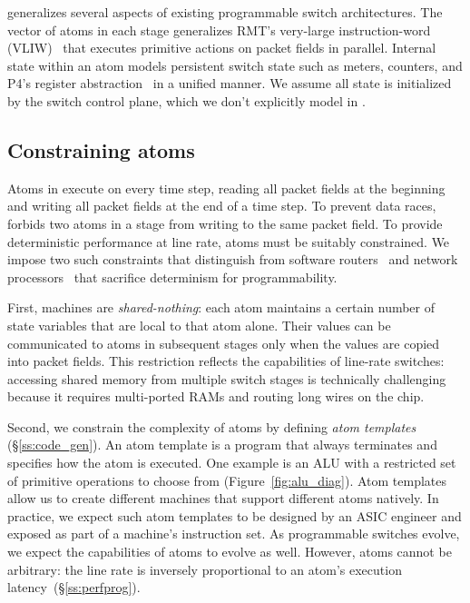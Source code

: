 \absmachine generalizes several aspects of existing programmable switch
architectures. The vector of atoms in each stage generalizes RMT's very-large
instruction-word (VLIW)~\cite{rmt} that executes primitive actions on packet
fields in parallel. Internal state within an atom models persistent switch
state such as meters, counters, and P4's register abstraction~\cite{p4spec} in
a unified manner. We assume all state is initialized by the switch control
plane, which we don't explicitly model in \absmachine.

\subsection{Constraining atoms}
\label{s:atomConstraints}

Atoms in \absmachine execute on every time step, reading all packet fields at
the beginning and writing all packet fields at the end of a time step. To
prevent data races, \absmachine forbids two atoms in a stage from writing to
the same packet field.  To provide deterministic performance at line rate,
atoms must be suitably constrained.  We impose two such constraints that
distinguish \absmachine from software routers~\cite{click} and network
processors~\cite{ixp4xx} that sacrifice determinism for programmability.

First, \absmachine machines are \textit{shared-nothing}: each atom maintains a
certain number of state variables that are local to that atom alone. Their
values can be communicated to atoms in subsequent stages only when the values
are copied into packet fields. This restriction reflects the capabilities of
line-rate switches: accessing shared memory from multiple switch stages is
technically challenging because it requires multi-ported RAMs and routing long
wires on the chip.

Second, we constrain the complexity of atoms by defining {\it atom templates}
(\S\ref{ss:code_gen}).  An atom template is a program that always terminates
and specifies how the atom is executed. One example is an ALU with a restricted
set of primitive operations to choose from (Figure~\ref{fig:alu_diag}). Atom
templates allow us to create different \absmachine machines that support
different atoms natively. In practice, we expect such atom templates to be
designed by an ASIC engineer and exposed as part of a \absmachine machine's
instruction set. As programmable switches evolve, we expect the capabilities of
atoms to evolve as well. However, atoms cannot be arbitrary: the line rate is
inversely proportional to an atom's execution latency~(\S\ref{ss:perfprog}).
